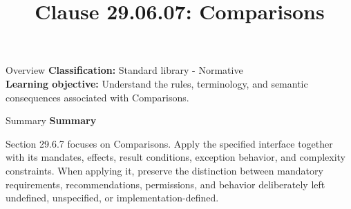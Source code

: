\documentclass[10pt,letterpaper]{article}
\title{Clause 29.06.07: Comparisons}
\author{}
\date{}
\begin{document}
\maketitle
\begin{CornellOverviewBox}{Overview}
\textbf{Classification:} Standard library - Normative\\[2pt]
\textbf{Learning objective:} Understand the rules, terminology, and semantic consequences associated with Comparisons.
\end{CornellOverviewBox}\begin{CornellSummaryBox}{Summary}
{\sffamily\bfseries\color{Accent} Summary}\par\vspace{3pt}Section 29.6.7 focuses on Comparisons. Apply the specified interface together with its mandates, effects, result conditions, exception behavior, and complexity constraints. When applying it, preserve the distinction between mandatory requirements, recommendations, permissions, and behavior deliberately left undefined, unspecified, or implementation-defined.
\end{CornellSummaryBox}
\end{document}

